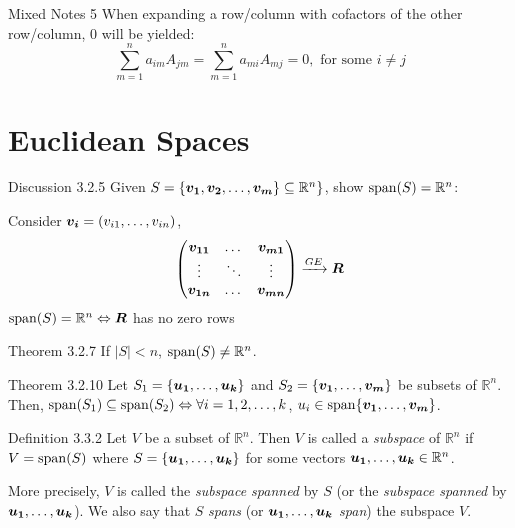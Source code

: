 \documentclass[10pt,portrait]{article}
\begin{document}
\begin{multicols}{2}
\begin{justifying}
\begin{namedthm*}{Mixed Notes 5}
	When expanding a row/column with cofactors of the other row/column, 0 will be yielded:
	\[
	    \sum_{m=1}^n a_{im}A_{jm} = \sum_{m=1}^n a_{mi}A_{mj} = 0, \text{ for some } i \ne j
	\]
\end{namedthm*}

\section{Euclidean Spaces}

\begin{namedthm*}{Discussion 3.2.5}
	Given \(S = \{\bm{v_1}, \bm{v_2}, \dots, \bm{v_m}\} \subseteq \mathbb{R}^n\}\), show \(\operatorname{span}(S) = \mathbb{R}^n\):
	
	\medskip
	\noindent
	Consider \(\bm{v_i} = \left(v_{i1}, \dots, v_{in}\right)\),
	\[
	\begin{pmatrix}
	\bm{v_{11}} & \dots & \bm{v_{m1}}\\
	\vdots & \ddots & \vdots\\
	\bm{v_{1n}} & \dots & \bm{v_{mn}}
	\end{pmatrix} \xrightarrow{GE} \bm{R}
	\]
	\(\operatorname{span}(S) = \mathbb{R}^n \Leftrightarrow \bm{R}\) has no zero rows
\end{namedthm*}

\begin{namedthm*}{Theorem 3.2.7}
	If \(|S| < n\), \(\operatorname{span}(S) \ne \mathbb{R}^n\).
\end{namedthm*}

\begin{namedthm*}{Theorem 3.2.10}
	Let \(S_1 = \{\bm{u_1}, \dots, \bm{u_k}\}\) and \(S_2 = \{\bm{v_1}, \dots, \bm{v_m}\}\) be subsets of \(\mathbb{R}^n\). Then, \(\operatorname{span}(S_1) \subseteq \operatorname{span}(S_2) \Leftrightarrow \forall i=1, 2, \dots, k\), \(u_i \in \operatorname{span}\{\bm{v_1}, \dots, \bm{v_m}\}\).
\end{namedthm*}

\begin{namedthm*}{Definition 3.3.2}
     Let \(V\) be a subset of \(\mathbb{R}^n\). Then \(V\) is called a \textit{subspace} of \(\mathbb{R}^n\) if \(V = \operatorname{span}(S)\) where \(S = \{\bm{u_1}, \dots, \bm{u_k}\}\) for some vectors \(\bm{u_1}, \dots, \bm{u_k} \in \mathbb{R}^n \).
     
     \medskip
     \noindent
     More precisely, \(V\) is called the \textit{subspace spanned} by \(S\) (or the \textit{subspace spanned} by \( \bm{u_1}, \dots, \bm{u_k} \)). We also say that \(S\) \textit{spans} (or \(\bm{u_1}, \dots, \bm{u_k}\) \textit{span}) the subspace \(V\).
     

\end{namedthm*}
\end{justifying}
\end{multicols}
\end{document}
